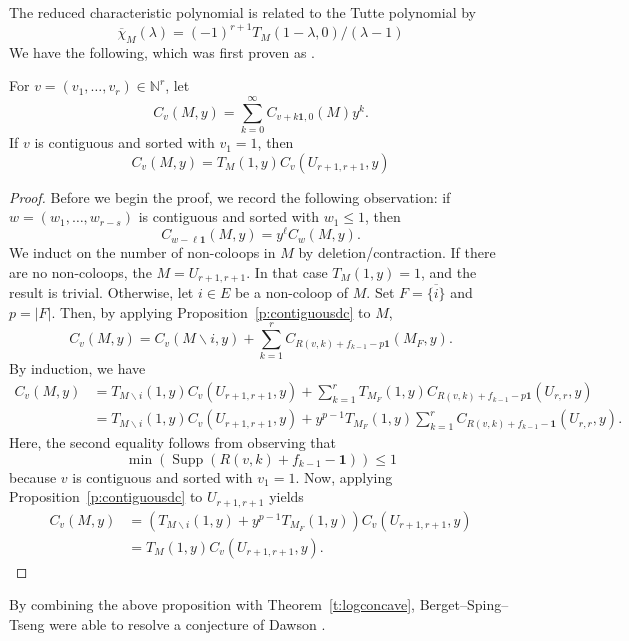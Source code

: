 \documentclass[ALCO,published]{cedram}
\numberwithin{equation}{section}
\numberwithin{figure}{section}
\newcommand{\N}{\mathbb{N}}
\DeclareMathOperator{\Supp}{Supp}
\begin{document}
The reduced characteristic polynomial is related to the Tutte polynomial by
\[\overline{\chi}_M(\lambda)=(-1)^{r+1}T_M(1-\lambda,0)/(\lambda-1)\]
We have the following, which was first proven as \cite[Theorem~1.5]{BST}.

\begin{prop} \label{p:contiguoustutte}
For $v=(v_1,\dots,v_{r})\in \N^{r}$, let
\[C_{v}(M,y)=\sum_{k=0}^\infty C_{v+k\mathbf{1},0}(M)y^k.\]
  If $v$ is contiguous and sorted with $v_1=1$, then
  \[C_{v}(M,y)=T_M(1,y)C_{v}(U_{r+1,r+1},y)\]
\end{prop}

\begin{proof}
    Before we begin the proof, we record the following observation: if $w=(w_1,\dots,w_{r-s})$ is contiguous and sorted with $w_1\leq 1$, then 
    \[C_{w-\ell\mathbf{1}}(M,y)=y^{\ell}C_{w}(M,y).\]
    We induct on the number of non-coloops in $M$ by deletion/contraction. If there are no non-coloops, the $M=U_{r+1,r+1}$. In that case $T_M(1,y)=1$, and the result is trivial. Otherwise, let $i\in E$ be a non-coloop of $M$.
    Set $F=\overline{\{i\}}$ and $p=|F|$. Then, by applying Proposition~\ref{p:contiguousdc} to $M$,
    \[ C_{v}(M,y) = C_{v}(M\backslash i,y)+\sum_{k=1}^{r} C_{R(v,k)+f_{k-1}-p\mathbf{1}}(M_F,y). \]
    By induction, we have
    \begin{align*}
        C_{v}(M,y)
        &= T_{M\backslash i}(1,y)C_{v}(U_{r+1,r+1},y)+
        \sum_{k=1}^{r} T_{M_F}(1,y)C_{R(v,k)+f_{k-1}-p\mathbf{1}}(U_{r,r},y)\\
        &= T_{M\backslash i}(1,y)C_{v}(U_{r+1,r+1},y)+
        y^{p-1}T_{M_F}(1,y)\sum_{k=1}^{r} C_{R(v,k)+f_{k-1}-\mathbf{1}}(U_{r,r},y).
    \end{align*}
    Here, the second equality follows from observing that
    \[\min(\Supp(R(v,k)+f_{k-1}-\mathbf{1}))\leq 1\]
    because $v$ is contiguous and sorted with $v_1 = 1$. Now, applying Proposition~\ref{p:contiguousdc} to $U_{r+1,r+1}$ yields
    \begin{align*}
        C_{v}(M,y)
        &= \left(T_{M\backslash i}(1,y)+y^{p-1}T_{M_F}(1,y)\right)C_{v}(U_{r+1,r+1},y)\\
        &= T_M(1,y)C_{v}(U_{r+1,r+1},y).        
    \end{align*}
\end{proof}

By combining the above proposition with Theorem~\ref{t:logconcave}, Berget--Sping--Tseng \cite{BST} were able to resolve a conjecture of Dawson \cite{Dawson}.
\end{document}
